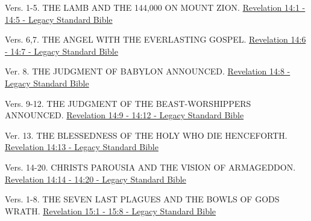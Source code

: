 \documentclass[
  ignorenonframetext,
]{beamer}
\begin{document}
\begin{frame}{14}
\label{section-267}
\begin{block}{Vers. 1-5. THE LAMB AND THE 144,000 ON MOUNT ZION.}
\label{vers.-1-5.-the-lamb-and-the-144000-on-mount-zion.}
\href{https://read.lsbible.org/?q=rev14\%3A1-5}{Revelation 14:1 - 14:5 -
Legacy Standard Bible}
\end{block}

\begin{block}{Vers. 6,7. THE ANGEL WITH THE EVERLASTING GOSPEL.}
\label{vers.-67.-the-angel-with-the-everlasting-gospel.}
\href{https://read.lsbible.org/?q=rev14\%3A6-7}{Revelation 14:6 - 14:7 -
Legacy Standard Bible}
\end{block}

\begin{block}{Ver. 8. THE JUDGMENT OF BABYLON ANNOUNCED.}
\label{ver.-8.-the-judgment-of-babylon-announced.}
\href{https://read.lsbible.org/?q=rev14\%3A8}{Revelation 14:8 - Legacy
Standard Bible}
\end{block}

\begin{block}{Vers. 9-12. THE JUDGMENT OF THE BEAST-WORSHIPPERS
ANNOUNCED.}
\label{vers.-9-12.-the-judgment-of-the-beast-worshippers-announced.}
\href{https://read.lsbible.org/?q=rev14\%3A9-12}{Revelation 14:9 - 14:12
- Legacy Standard Bible}
\end{block}

\begin{block}{Ver. 13. THE BLESSEDNESS OF THE HOLY WHO DIE HENCEFORTH.}
\label{ver.-13.-the-blessedness-of-the-holy-who-die-henceforth.}
\href{https://read.lsbible.org/?q=rev14\%3A13}{Revelation 14:13 - Legacy
Standard Bible}
\end{block}

\begin{block}{Vers. 14-20. CHRIST\textquotesingle S PAROUSIA AND THE
VISION OF ARMAGEDDON.}
\label{vers.-14-20.-christs-parousia-and-the-vision-of-armageddon.}
\href{https://read.lsbible.org/?q=rev14\%3A14-20}{Revelation 14:14 -
14:20 - Legacy Standard Bible}
\end{block}
\end{frame}

\begin{frame}{15}
\label{section-268}
\begin{block}{Vers. 1-8. THE SEVEN LAST PLAGUES AND THE BOWLS OF
GOD\textquotesingle S WRATH.}
\label{vers.-1-8.-the-seven-last-plagues-and-the-bowls-of-gods-wrath.}
\href{https://read.lsbible.org/?q=rev15\%3A1-8}{Revelation 15:1 - 15:8 -
Legacy Standard Bible}
\end{block}
\end{frame}
\end{document}
